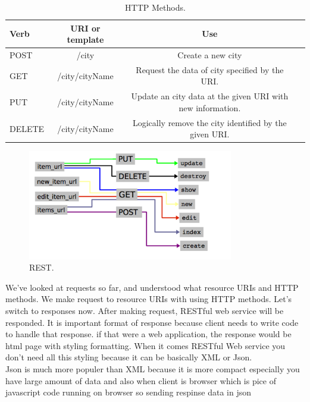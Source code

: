 \begin{table}[!htb]
  \renewcommand{\arraystretch}{1.2} %
  \centering
  \begin{tabular}{lccc}
    \toprule
    Verb           & URI or template & Use  \\
    \midrule
    POST           & /city & Create a new city\\
    GET            & /city/{cityName} & Request the data of city specified by the URI.\\
    PUT            & /city/{cityName} & Update an city data at the given URI with new information.\\
    DELETE            & /city/{cityName} & Logically remove the city identified by the given URI.\\
    \bottomrule
  \end{tabular}
  \caption[HTTP Methods.]{HTTP Methods.}
  \label{tab:aeroCoeff}
\end{table}

\begin{figure}[!htb]
  \centering
  \includegraphics[width=0.8\textwidth]{Figures/rest.png}
  \caption[REST.]{REST.}
  \label{fig:rest}
\end{figure}

We've looked at requests so far, and understood what resource URIs and HTTP methods.
We make request to resource URIs with using HTTP methods. Let's switch to responses now.
After making request, RESTful web service will be responded. It is important format of response
because client needs to write code to handle that response. if that were a web application,
the response would be html page  with styling formatting. When it comes  RESTful Web service
you don't need all this styling because it can be basically  XML or Json.\\

Json is much more populer than XML because it is more compact especially you have large amount of data and also
when client is browser which is pice of javascript code running on browser
so sending respinse data in json


